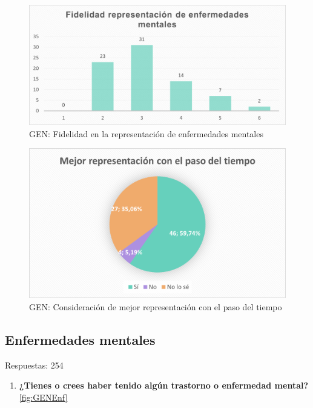 \documentclass[12pt, a4paper,twoside,titlepage]{book}
\begin{document}
\begin{figure}
    \centering
    \includegraphics[width=.8\linewidth]{ANEXO Gen/19AnexGENFid}
    \caption{GEN: Fidelidad en la representación de enfermedades mentales}
    \label{fig:GENFidel}
\end{figure}

\begin{figure}
    \centering
    \includegraphics[width=.8\linewidth]{ANEXO Gen/20AnexGENMejor}
    \caption{GEN: Consideración de mejor representación con el paso del tiempo}
    \label{fig:GENMejor}
\end{figure}




\subsection{Enfermedades mentales}
Respuestas: 254
\begin{enumerate}[label=\textbf{\arabic*}.]
     \item \textbf{¿Tienes o crees haber tenido algún trastorno o enfermedad mental? }\\
     \ref{fig:GENEnf}
\end{enumerate}
\end{document}
